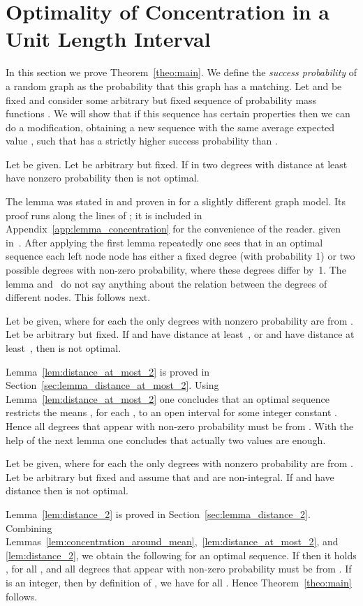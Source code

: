 \let\accentvec\vec \documentclass{llncs}
\begin{document}
\section{Optimality of Concentration in a Unit Length Interval}
In this section we prove Theorem~\ref{theo:main}.
We define the \emph{success probability} of a random graph as the probability that this graph has a matching.
Let  and  be fixed and consider some arbitrary but fixed sequence of probability mass functions .
We will show that if this sequence has certain properties then we can do a modification, obtaining a new sequence  
with the same average expected value , such that  has 
a strictly higher success probability than .
\begin{lemma}
\label{lem:concentration_around_mean}
Let  be given.
Let  be arbitrary but fixed.
If in  two degrees with distance at least  have nonzero probability then  is not optimal.
\end{lemma}
The lemma was stated in \cite{DGMMPR_tight_2010} and proven in \cite{DGMMPR_tight_2009_full} for a slightly different graph model.
Its proof runs along the lines of \cite{DGMMPR_tight_2009_full}; it is 
\ifnum{}
included in Appendix~\ref{app:lemma_concentration} for the convenience of the reader.
\else
given in~\cite[Appendix A]{full_version}.
\fi
After applying the first lemma repeatedly one sees that in an optimal sequence
each left node node has either a fixed degree (with probability 1) or two possible degrees with non-zero probability,
where these degrees differ by~1.
The lemma and~\cite{DGMMPR_tight_2009_full,DGMMPR_tight_2010} do not say anything about the relation between the degrees of different nodes.
This follows next.
\begin{lemma}
\label{lem:distance_at_most_2}
Let  be given, where for each  the only degrees with 
nonzero probability are from .
Let  be arbitrary but fixed.
If  and  have distance at least~, 
or  and  have distance at least~,
then  is not optimal.
\end{lemma}
Lemma~\ref{lem:distance_at_most_2} is proved in Section~\ref{sec:lemma_distance_at_most_2}.
Using Lemma~\ref{lem:distance_at_most_2} one concludes that an optimal sequence restricts the means , for each ,
to an open interval  for some integer constant . 
Hence all degrees that appear with non-zero probability must be from .
With the help of the next lemma one concludes that actually two values are enough.
\begin{lemma}
\label{lem:distance_2}
Let  be given, where for each  the only degrees with 
nonzero probability are from . 
Let  be arbitrary but fixed and assume that  and  are non-integral.
If  and  have distance  then  is not optimal.
\end{lemma}
Lemma~\ref{lem:distance_2} is proved in Section~\ref{sec:lemma_distance_2}.
Combining Lemmas~\ref{lem:concentration_around_mean},~\ref{lem:distance_at_most_2}, and \ref{lem:distance_2},
we obtain the following for an optimal sequence.
If  then it holds , for all ,
and all degrees that appear with non-zero probability must be from .
If  is an integer, then by definition of , we have  for all .
Hence Theorem~\ref{theo:main} follows.
\end{document}
